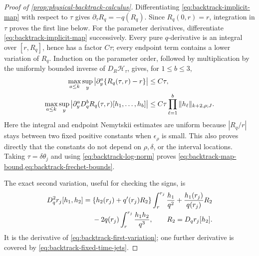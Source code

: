 \begin{proof}[Proof of \cref{prop:physical-backtrack-calculus}]
Differentiating \cref{eq:backtrack-implicit-map} with respect to \(\tau\)
gives \(\partial_\tau R_q=-q(R_q)\).  Since \(R_q(0,r)=r\), integration in
\(\tau\) proves the first line below.  For the parameter derivatives,
differentiate \cref{eq:backtrack-implicit-map} successively.  Every pure
\(q\)-derivative is an integral over \([r,R_q]\), hence has a factor
\(C\tau\); every endpoint term contains a lower variation of \(R_q\).
Induction on the parameter order, followed by multiplication by the uniformly
bounded inverse of \(D_R\mathscr H_\tau\), gives, for \(1\le b\le3\),
\begin{align}
 \max_{a\le k}\sup_y
 \left|\partial_y^a\{R_q(\tau,r)-r\}\right|
 &\le C\tau,\notag\\
 \max_{a\le k}\sup_y
 \left|\partial_y^aD_q^bR_q(\tau,r)
          [h_1,\ldots,h_b]\right|
 &\le C\tau\prod_{\ell=1}^b
       \|h_\ell\|_{k+2,\rho;J}.                    \label{eq:backtrack-fixed-time-jets}
\end{align}
Here the integral and endpoint Nemytskii estimates are uniform because
\(|R_q/r|\) stays between two fixed positive constants when
\(\epsilon_\rho\) is small.  This also proves directly that the constants do
not depend on \(\rho,\delta\), or the interval locations.  Taking
\(\tau=\delta\theta_j\) and using
\cref{eq:backtrack-log-norm} proves
\cref{eq:backtrack-map-bound,eq:backtrack-frechet-bounds}.

The exact second variation, useful for checking the signs, is
\begin{align}
 D_q^2r_j[h_1,h_2]
={}&\{h_2(r_j)+q'(r_j)R_2\}
       \int_r^{r_j}\frac{h_1}{q^2}
 +\frac{h_1(r_j)}{q(r_j)}R_2\notag\\
 &-2q(r_j)\int_r^{r_j}\frac{h_1h_2}{q^3},
 \qquad R_2=D_qr_j[h_2].                            \label{eq:backtrack-second-variation}
\end{align}
It is the derivative of \cref{eq:backtrack-first-variation}; one further
derivative is covered by \cref{eq:backtrack-fixed-time-jets}.


\end{proof}
